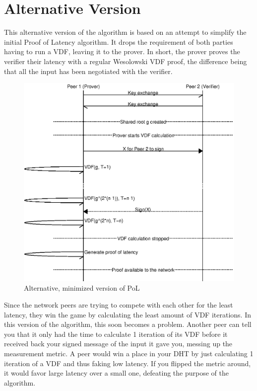 \section{Alternative Version}
This alternative version of the algorithm is based on an attempt to simplify the initial Proof of Latency algorithm. It drops the requirement of both parties having to run a VDF, leaving it to the prover. In short, the prover proves the verifier their latency with a regular Wesolowski VDF proof, the difference being that all the input has been negotiated with the verifier.
\begin{figure}
	\includegraphics[width=\textwidth]{pictures/pol1_diagram.eps}
        \caption{Alternative, minimized version of PoL}
	\label{PoL Diagram 1}
\end{figure}
Since the network peers are trying to compete with each other for the least latency, they win the game by calculating the least amount of VDF iterations. In this version of the algorithm, this soon becomes a problem. Another peer can tell you that it only had the time to calculate 1 iteration of its VDF before it received back your signed message of the input it gave you, messing up the measurement metric. A peer would win a place in your DHT by just calculating 1 iteration of a VDF and thus faking low latency. If you flipped the metric around, it would favor large latency over a small one, defeating the purpose of the algorithm.

